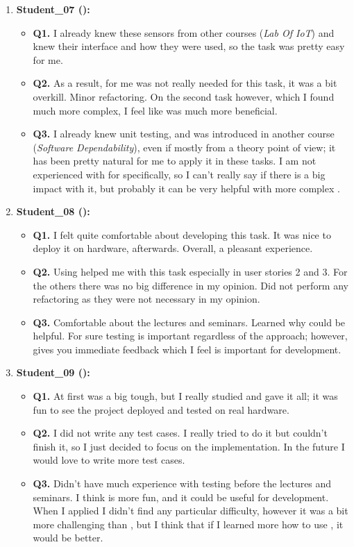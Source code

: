 \begin{enumerate}
    \item \textbf{Student\_07 (\tdd):}
    \begin{itemize}
        \item \textbf{Q1.} I already knew these sensors from other courses (\textit{Lab Of IoT}) and knew their interface and how they were used, so the task was pretty easy for me.
        \item \textbf{Q2.} As a result, \tdd for me was not really needed for this task, it was a bit overkill. Minor refactoring. On the second task however, which I found much more complex, I feel like \tdd was much more beneficial. 
        \item \textbf{Q3.} I already knew unit testing, and \tdd was introduced in another course (\textit{Software Dependability}), even if mostly from a theory point of view; it has been pretty natural for me to apply it in these tasks. I am not experienced with \tdd for \ess specifically, so I can't really say if there is a big impact with it, but probably it can be very helpful with more complex \ess.
    \end{itemize}

    \item \textbf{Student\_08 (\tdd):}
    \begin{itemize}
        \item \textbf{Q1.} I felt quite comfortable about developing this task. It was nice to deploy it on hardware, afterwards. Overall, a pleasant experience.
        \item \textbf{Q2.} Using \tdd helped me with this task especially in user stories 2 and 3. For the others there was no big   difference in my opinion. Did not perform any refactoring as they were not necessary in my opinion.
        \item \textbf{Q3.} Comfortable about the lectures and seminars. Learned why \tdd could be helpful. For sure testing \ess is important regardless of the approach; however, \tdd gives you immediate feedback which I feel is important for \es development.
    \end{itemize}

    \item \textbf{Student\_09 (\tdd):}
    \begin{itemize}
        \item \textbf{Q1.} At first was a big tough, but I really studied and gave it all; it was fun to see the project deployed and tested on real hardware.
        \item \textbf{Q2.} I did not write any test cases. I really tried to do it but couldn't finish it, so I just decided to focus on the implementation. In the future I would love to write more test cases.
        \item \textbf{Q3.} Didn't have much experience with testing before the lectures and seminars. I think \tdd is more fun, and it could be useful for \es development. When I applied \tdd I didn't find any particular difficulty, however it was a bit more challenging than \notdd, but I think that if I learned more how to use \tdd, it would be better.
    \end{itemize}
\end{enumerate}
